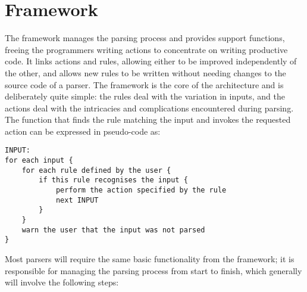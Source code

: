 \section{Framework}

\label{framework in architecture}

The framework manages the parsing process and provides support functions,
freeing the programmers writing actions to concentrate on writing
productive code.  It links actions and rules, allowing either to be
improved independently of the other, and allows new rules to be written
without needing changes to the source code of a parser.  The framework is
the core of the architecture and is deliberately quite simple: the rules
deal with the variation in inputs, and the actions deal with the
intricacies and complications encountered during parsing.  The function
that finds the rule matching the input and invokes the requested action can
be expressed in pseudo-code as:

\begin{verbatim}
INPUT:
for each input {
    for each rule defined by the user {
        if this rule recognises the input {
            perform the action specified by the rule
            next INPUT
        }
    }
    warn the user that the input was not parsed
}
\end{verbatim}

Most parsers will require the same basic functionality from the framework;
it is responsible for managing the parsing process from start to finish,
which generally will involve the following steps:

